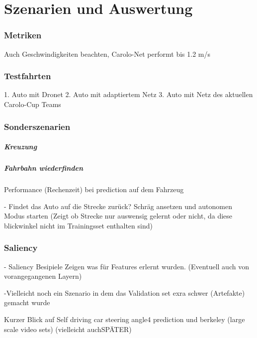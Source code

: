 %
\chapter{Szenarien und Auswertung}

\subsection{Metriken}


Auch Geschwindigkeiten beachten, Carolo-Net performt bis 1.2 m/s
\subsection{Testfahrten}

1. Auto mit Dronet 
2. Auto mit adaptiertem Netz
3. Auto mit Netz des aktuellen Carolo-Cup Teams 

\subsection{Sonderszenarien}

\paragraph{Kreuzung}

\paragraph{Fahrbahn wiederfinden}

Performance (Rechenzeit) bei prediction auf dem Fahrzeug


- Findet das Auto auf die Strecke zurück? Schräg ansetzen und autonomen Modus starten
(Zeigt ob Strecke nur auswensig gelernt oder nicht, da  diese blickwinkel nicht im Trainingsset enthalten sind)

\subsection{Saliency}
- Saliency Besipiele Zeigen was für Features erlernt wurden. (Eventuell auch von vorangegangenen Layern)

-Vielleicht noch ein Szenario in dem das Validation set exra schwer (Artefakte) gemacht wurde




Kurzer Blick auf  Self driving car steering angle4 prediction und berkeley (large scale video sets) (vielleicht auchSPÄTER)